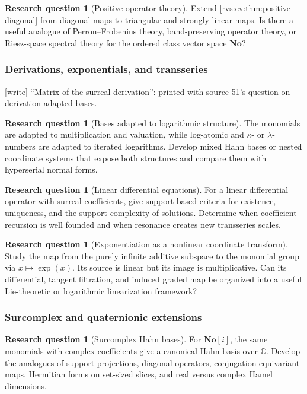 \documentclass[11pt,letterpaper]{article}
\numberwithin{equation}{section}
\theoremstyle{definition}
\newtheorem{question}[theorem]{Research question}
\theoremstyle{remark}
\newcommand{\No}{\mathbf{No}}
\newcommand{\wtag}{\textup{[write]}}%
\begin{document}
\begin{question}[Positive-operator theory]
Extend \cref{rvs:cv:thm:positive-diagonal} from diagonal maps to triangular and strongly
linear maps. Is there a useful analogue of Perron--Frobenius theory, band-preserving
operator theory, or Riesz-space spectral theory for the ordered class vector space
$\No$?
\end{question}
\subsubsection{Derivations, exponentials, and transseries}

\noindent\wtag{} ``Matrix of the surreal derivation'': printed with source
51's question on derivation-adapted bases.

\begin{question}[Bases adapted to logarithmic structure]
The monomials are adapted to multiplication and valuation, while log-atomic and
$\kappa$- or $\lambda$-numbers are adapted to iterated logarithms. Develop mixed
Hahn bases or nested coordinate systems that expose both structures and compare
them with hyperserial normal forms.
\end{question}

\begin{question}[Linear differential equations]
For a linear differential operator with surreal coefficients, give support-based
criteria for existence, uniqueness, and the support complexity of solutions.
Determine when coefficient recursion is well founded and when resonance creates
new transseries scales.
\end{question}

\begin{question}[Exponentiation as a nonlinear coordinate transform]
Study the map from the purely infinite additive subspace to the monomial group via
$x\mapsto\exp(x)$. Its source is linear but its image is multiplicative. Can its
differential, tangent filtration, and induced graded map be organized into a useful
Lie-theoretic or logarithmic linearization framework?
\end{question}

\subsubsection{Surcomplex and quaternionic extensions}

\begin{question}[Surcomplex Hahn bases]
For $\No[i]$, the same monomials with complex coefficients give a canonical Hahn
basis over $\mathbb C$. Develop the analogues of support projections, diagonal
operators, conjugation-equivariant maps, Hermitian forms on set-sized slices, and
real versus complex Hamel dimensions.
\end{question}
\end{document}
